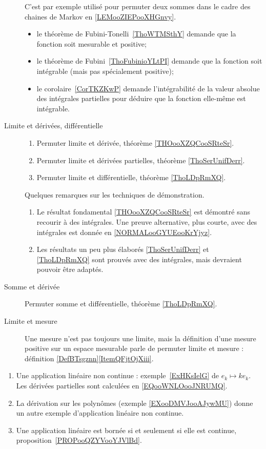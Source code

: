 \begin{description}
        C'est par exemple utilisé pour permuter deux sommes dans le cadre des chaines de Markov en \ref{LEMooZIEPooXHGnvy}.
\begin{itemize}
    \item
        le théorème de Fubini-Tonelli~\ref{ThoWTMSthY} demande que la fonction soit mesurable et positive;
    \item
        le théorème de Fubini~\ref{ThoFubinioYLtPI} demande que la fonction soit intégrable (mais pas spécialement positive);
    \item
        le corolaire~\ref{CorTKZKwP} demande l'intégrabilité de la valeur absolue des intégrales partielles pour déduire que la fonction elle-même est intégrable.
\end{itemize}

\item[Limite et dérivées, différentielle]
    \begin{enumerate}
        \item
            Permuter limite et dérivée, théorème \ref{THOooXZQCooSRteSr}.
        \item
 Permuter limite et dérivées partielles, théorème \ref{ThoSerUnifDerr}.
        \item
            Permuter limite et différentielle, théorème \ref{ThoLDpRmXQ}.
    \end{enumerate}
    Quelques remarques sur les techniques de démonstration.
    \begin{enumerate}
        \item
            Le résultat fondamental \ref{THOooXZQCooSRteSr} est démontré sans recourir à des intégrales. Une preuve alternative, plus courte, avec des intégrales est donnée en \ref{NORMALooGYUEooKrYjyz}.
        \item
            Les résultats un peu plus élaborés \ref{ThoSerUnifDerr} et \ref{ThoLDpRmXQ} sont prouvés avec des intégrales, mais devraient pouvoir être adaptés.
    \end{enumerate}
\item[Somme et dérivée]
    Permuter somme et différentielle, théorème \ref{ThoLDpRmXQ}.
\item[Limite et mesure]
    Une mesure n'est pas toujours une limite, mais la définition d'une mesure positive sur un espace mesurable parle de permuter limite et mesure : définition \ref{DefBTsgznn}\ref{ItemQFjtOjXiii}.
\end{description}


       \label{THEMEooYCBUooEnFdUg}
\begin{enumerate}
    \item
        Une application linéaire non continue : exemple~\ref{ExHKsIelG} de \( e_k\mapsto ke_k\). Les dérivées partielles sont calculées en \eqref{EQooWNLOooJNRUMQ}.
    \item
        La dérivation sur les polynômes (exemple \ref{EXooDMVJooAJywMU}) donne un autre exemple d'application linéaire non continue.
    \item
        Une application linéaire est bornée si et seulement si elle est continue, proposition~\ref{PROPooQZYVooYJVlBd}.
\end{enumerate}


